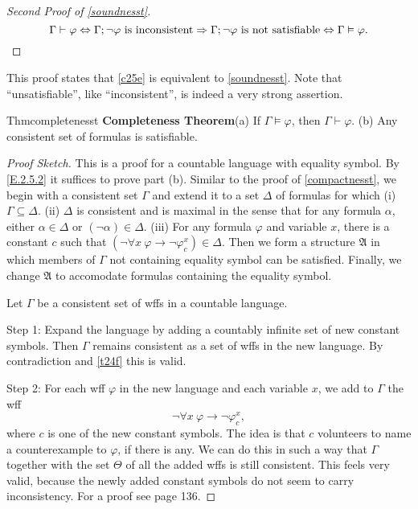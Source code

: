 \begin{proof}[Second Proof of \ref{soundnesst}]
  \[
    \Gamma\vdash \varphi\Leftrightarrow \Gamma;\neg \varphi\text{ is inconsistent}\Rightarrow \Gamma;\neg \varphi\text{ is not satisfiable}\Leftrightarrow \Gamma\vDash \varphi.\qedhere
  \]
\end{proof}
This proof states that \ref{c25e} is equivalent to \ref{soundnesst}. Note that ``unsatisfiable'', like ``inconsistent'', is indeed a very strong assertion.

\begin{reference}{Thm}{completenesst}
  \textbf{Completeness Theorem}\quad(a) If $\Gamma\vDash \varphi$, then $\Gamma\vdash \varphi$. (b) Any consistent set of formulas is satisfiable.\qedhere
\end{reference}

\begin{proof}[Proof Sketch]
  This is a proof for a countable language with equality symbol. By \ref{E.2.5.2} it suffices to prove part (b). Similar to the proof of \ref{compactnesst}, we begin with a consistent set $\Gamma$ and extend it to a set $\Delta$ of formulas for which (i) $\Gamma\subseteq \Delta$. (ii) $\Delta$ is consistent and is maximal in the sense that for any formula $\alpha$, either $\alpha\in \Delta$ or $(\neg \alpha)\in \Delta$. (iii) For any formula $\varphi$ and variable $x$, there is a constant $c$ such that $(\neg\forall x\ \varphi\rightarrow\neg \varphi_c^x)\in \Delta.$ Then we form a structure $\mathfrak{A}$ in which members of $\Gamma$ not containing equality symbol can be satisfied. Finally, we change $\mathfrak{A}$ to accomodate formulas containing the equality symbol.

  Let $\Gamma$ be a consistent set of wffs in a countable language.

  Step 1: Expand the language by adding a countably infinite set of new constant symbols. Then $\Gamma$ remains consistent as a set of wffs in the new language. By contradiction and \ref{t24f} this is valid.

  Step 2: For each wff $\varphi$ in the new language and each variable $x$, we add to $\Gamma$ the wff
  \[
    \neg\forall x\ \varphi\rightarrow\neg \varphi_c^x,
  \]
  where $c$ is one of the new constant symbols. The idea is that $c$ volunteers to name a counterexample to $\varphi$, if there is any. We can do this in such a way that $\Gamma$ together with the set $\Theta$ of all the added wffs is still consistent. This feels very valid, because the newly added constant symbols do not seem to carry inconsistency. For a proof see page 136.


\end{proof}
